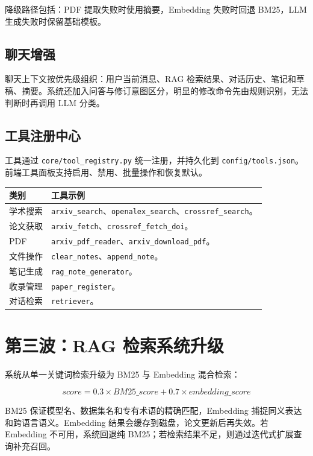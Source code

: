 \documentclass[12pt,a4paper,onecolumn]{ctexart}
\newcommand{\code}[1]{\texttt{#1}}
\begin{document}
降级路径包括：PDF 提取失败时使用摘要，Embedding 失败时回退 BM25，LLM 生成失败时保留基础模板。

\subsection{聊天增强}

聊天上下文按优先级组织：用户当前消息、RAG 检索结果、对话历史、笔记和草稿、摘要。系统还加入问答与修订意图区分，明显的修改命令先由规则识别，无法判断时再调用 LLM 分类。

\subsection{工具注册中心}

工具通过 \code{core/tool\_registry.py} 统一注册，并持久化到 \code{config/tools.json}。前端工具面板支持启用、禁用、批量操作和恢复默认。

\begin{longtable}{p{3.2cm}p{8.5cm}}
\toprule
\textbf{类别} & \textbf{工具示例} \\
\midrule
学术搜索 & \code{arxiv\_search}、\code{openalex\_search}、\code{crossref\_search}。\\
论文获取 & \code{arxiv\_fetch}、\code{crossref\_fetch\_doi}。\\
PDF & \code{arxiv\_pdf\_reader}、\code{arxiv\_download\_pdf}。\\
文件操作 & \code{clear\_notes}、\code{append\_note}。\\
笔记生成 & \code{rag\_note\_generator}。\\
收录管理 & \code{paper\_register}。\\
对话检索 & \code{retriever}。\\
\bottomrule
\end{longtable}

\section{第三波：RAG 检索系统升级}

系统从单一关键词检索升级为 BM25 与 Embedding 混合检索：

\[
score = 0.3 \times BM25\_score + 0.7 \times embedding\_score
\]

BM25 保证模型名、数据集名和专有术语的精确匹配，Embedding 捕捉同义表达和跨语言语义。Embedding 结果会缓存到磁盘，论文更新后再失效。若 Embedding 不可用，系统回退纯 BM25；若检索结果不足，则通过迭代式扩展查询补充召回。
\end{document}
